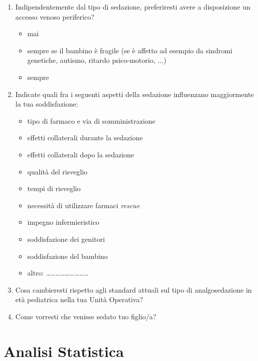 \begin{tcolorbox}[breakable,notitle,boxrule=0pt,colback=xkcdCloudyBlue!30,colframe=xkcdCloudyBlue!30]
\begin{enumerate}
           \item Indipendentemente dal tipo di sedazione, preferiresti avere a disposizione un accesso venoso periferico?
           \begin{itemize}
               \item mai
               \item sempre se il bambino è fragile (se è affetto ad esempio da sindromi genetiche, autismo, ritardo psico-motorio, ...)
               \item sempre
           \end{itemize}
\newpage
           \item Indicate quali fra i seguenti aspetti della sedazione influenzano maggiormente la tua soddisfazione:
           \begin{itemize}
                \item tipo di farmaco e via di somministrazione
                \item effetti collaterali durante la sedazione
                \item effetti collaterali dopo la sedazione
                \item qualità del risveglio
                \item tempi di risveglio
                \item necessità di utilizzare farmaci \emph{rescue}
                \item impegno infermieristico
                \item soddisfazione dei genitori
                \item soddisfazione del bambino
                \item altro: ………………………

           \end{itemize}
           \item Cosa cambieresti rispetto agli standard attuali sul tipo di analgosedazione in età pediatrica nella tua Unità Operativa?
           
           \item Come vorresti che venisse sedato tuo figlio/a?
           
           

\end{enumerate}

\end{tcolorbox}

\section{Analisi Statistica}

